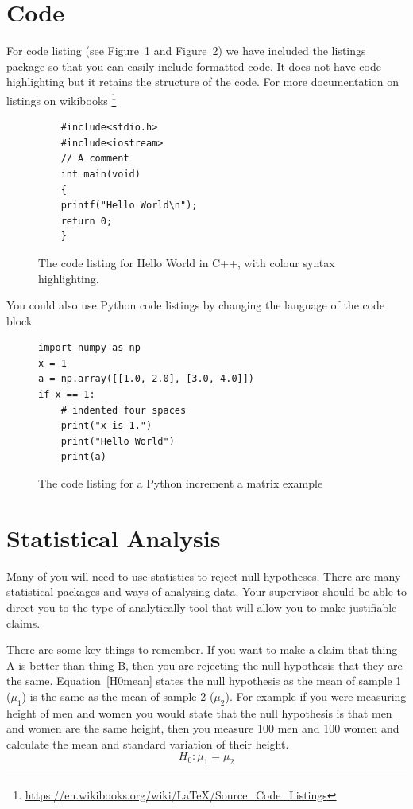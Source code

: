 \section{Code}

For code listing (see Figure~\ref{fig:HelloWorldC++} and Figure~\ref{fig:PythonCode}) we have included the listings package so that you can easily include formatted code.  It does not have code highlighting but it retains the structure of the code.  For more documentation on listings on wikibooks \footnote{\url{https://en.wikibooks.org/wiki/LaTeX/Source_Code_Listings}}


\begin{figure}[tp] 
  \centering
{}
\begin{lstlisting}
    #include<stdio.h>
    #include<iostream>
    // A comment
    int main(void)
    {
    printf("Hello World\n");
    return 0;
    }
\end{lstlisting}
  \caption[Hello World C++]{The code listing for Hello World in C++, with colour syntax highlighting.}
  \label{fig:HelloWorldC++}
\end{figure}

You could also use Python code listings by changing the language of the code block

\begin{figure}[tp] 
  \centering
\lstset{language=Python}
\begin{lstlisting}
import numpy as np
x = 1
a = np.array([[1.0, 2.0], [3.0, 4.0]])
if x == 1:
    # indented four spaces
    print("x is 1.")
    print("Hello World")
    print(a)
\end{lstlisting}
  \caption[Python code example]{The code listing for a Python increment a matrix example}
  \label{fig:PythonCode}
\end{figure}

\section{Statistical Analysis}

Many of you will need to use statistics to reject null hypotheses.  There are many statistical packages and ways of analysing data.  Your supervisor should be able to direct you to the type of analytically tool that will allow you to make justifiable claims.

There are some key things to remember.  If you want to make a claim that thing A is better than thing B, then you are rejecting the null hypothesis that they are the same. Equation~\ref{H0mean} states the null hypothesis as the mean of sample 1 ($\mu_1$) is the same as the mean of sample 2 ($\mu_2$). For example if you were measuring height of men and women you would state that the null hypothesis is that men and women are the same height, then you measure 100 men and 100 women and calculate the mean and standard variation of their height. 
\begin{equation} 
\label{H0mean}
    H_0 : \mu_1 = \mu_2
\end{equation}

